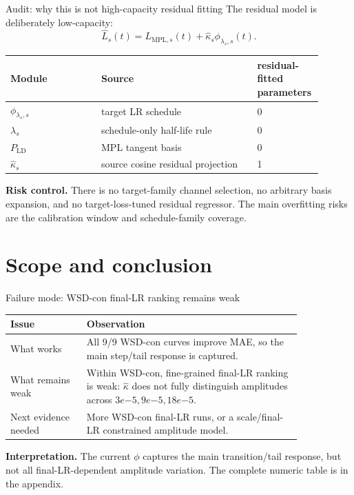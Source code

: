 \documentclass[9pt,aspectratio=169]{beamer}
\begin{document}
\begin{frame}{Audit: why this is not high-capacity residual fitting}
\small
The residual model is deliberately low-capacity:
\[
\widehat L_s(t)
=
L_{\mathrm{MPL},s}(t)
+\widehat\kappa_s\phi_{\lambda_s,s}(t).
\]
\vfill
\begin{center}
\begin{tabular}{L{0.28\linewidth}L{0.48\linewidth}L{0.14\linewidth}}
\toprule
Module & Source & residual-fitted parameters\\
\midrule
\(\phi_{\lambda_s,s}\) & target LR schedule & 0\\
\(\lambda_s\) & schedule-only half-life rule & 0\\
\(P_{\mathrm{LD}}\) & MPL tangent basis & 0\\
\(\widehat\kappa_s\) & source cosine residual projection & 1\\
\bottomrule
\end{tabular}
\end{center}
\vfill
\textbf{Risk control.}
There is no target-family channel selection, no arbitrary basis expansion,
and no target-loss-tuned residual regressor.
The main overfitting risks are the calibration window and schedule-family coverage.
\end{frame}

\section{Scope and conclusion}

\begin{frame}{Failure mode: WSD-con final-LR ranking remains weak}
\small
\begin{center}
\begin{tabular}{L{0.22\linewidth}L{0.62\linewidth}}
\toprule
Issue & Observation\\
\midrule
What works &
All 9/9 WSD-con curves improve MAE, so the main step/tail response is captured.\\
\addlinespace
What remains weak &
Within WSD-con, fine-grained final-LR ranking is weak:
\(\widehat\kappa\) does not fully distinguish amplitudes across \(3e{-5},9e{-5},18e{-5}\).\\
\addlinespace
Next evidence needed &
More WSD-con final-LR runs, or a scale/final-LR constrained amplitude model.\\
\bottomrule
\end{tabular}
\end{center}
\vfill
\textbf{Interpretation.}
The current \(\phi\) captures the main transition/tail response,
but not all final-LR-dependent amplitude variation.
The complete numeric table is in the appendix.
\end{frame}
\end{document}
